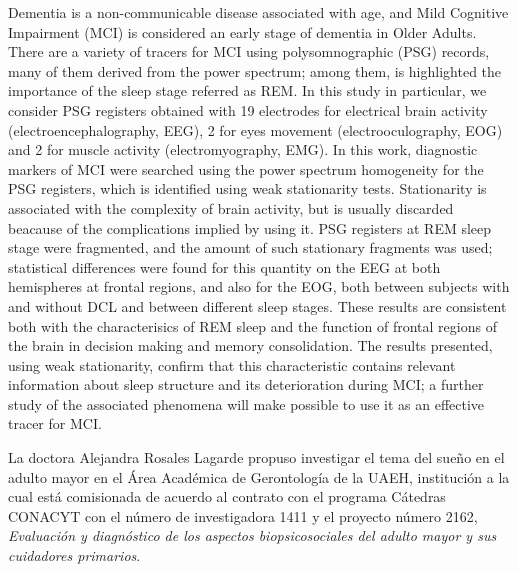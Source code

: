 \documentclass[12pt,letterpaper]{book}
\begin{document}
\begin{small}
Dementia is a non-communicable disease associated with age, and Mild Cognitive Impairment (MCI) is considered an early stage of dementia in Older Adults.
%
There are a variety of tracers for MCI using polysomnographic (PSG) records, many of them derived from the power spectrum; among them, is highlighted the importance of the sleep stage referred as REM.
%
In this study in particular, we consider PSG registers obtained with 19 electrodes for electrical brain activity (electroencephalography, EEG), 2 for eyes movement (electrooculography, EOG) and 2 for muscle activity (electromyography, EMG).
%
In this work, diagnostic markers of MCI were searched using the power spectrum homogeneity for the PSG registers, which is identified using weak stationarity tests.
%
Stationarity is associated with the complexity of brain activity, but is usually discarded beacause of the complications implied by using it.
%
PSG registers at REM sleep stage were fragmented, and the amount of such stationary fragments was used;
statistical differences were found for this quantity on the EEG at both hemispheres at frontal regions, and also for the EOG, both between subjects with and without DCL and between different sleep stages.
%
These results are consistent both with the characterisics of REM sleep and the function of frontal regions of the brain in decision making and memory consolidation.
%
The results presented, using weak stationarity, confirm that this characteristic contains relevant information about sleep structure and its deterioration during MCI; a further study of the associated phenomena will make possible to use it as an effective tracer for MCI.
\end{small}


\newpage

La doctora Alejandra Rosales Lagarde propuso investigar el tema del sueño en el adulto mayor en el Área Académica de Gerontología de la UAEH, institución a la cual está comisionada de acuerdo al  contrato con el programa Cátedras CONACYT con el número de investigadora 1411 y el proyecto número  2162, \textit{Evaluación y diagnóstico de los aspectos biopsicosociales del adulto mayor y sus  cuidadores primarios}. 
\end{document}
